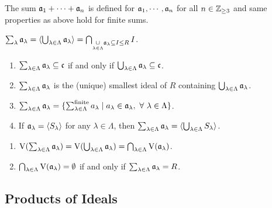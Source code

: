 \begin{remark}
    The sum $\mathfrak{a}_1 + \cdots + \mathfrak{a}_n$ is defined for $\mathfrak{a}_1,\cdots,\mathfrak{a}_n$ for all $n \in \mathbb{Z}_{\geq 3}$ and same properties as above hold for finite sums.
\end{remark}

\begin{definition}
    $\sum_{\lambda} \mathfrak{a}_\lambda = \langle \bigcup_{\lambda \in \Lambda} \mathfrak{a}_\lambda \rangle = \bigcap_{\underset {\lambda \in \Lambda} \cup \mathfrak{a}_\lambda \subseteq I \leq R} I$.
\end{definition}

\begin{fact}
    \begin{enumerate}
        \item $\sum_{\lambda \in \Lambda} \mathfrak{a}_\lambda \subseteq \mathfrak{c}$ if and only if $\bigcup_{\lambda \in \Lambda} \mathfrak{a}_\lambda \subseteq \mathfrak{c}$.
        \item $\sum_{\lambda \in \Lambda} \mathfrak{a}_\lambda$ is the (unique) smallest ideal of $R$ containing $\bigcup_{\lambda \in \Lambda} \mathfrak{a}_\lambda$.
        \item $\sum_{\lambda \in \Lambda} \mathfrak{a}_\lambda = \{\sum_{\lambda \in \Lambda}^{\text{finite}}a_\lambda \mid a_\lambda \in \mathfrak{a}_\lambda, \ \forall \  \lambda \in \Lambda\}$.
        \item If $\mathfrak{a}_\lambda = \langle S_\lambda \rangle$ for any $\lambda \in \Lambda$, then $\sum_{\lambda \in \Lambda} \mathfrak{a}_\lambda = \langle \bigcup_{\lambda \in \Lambda}S_\lambda \rangle$.
    \end{enumerate}
\end{fact}

\begin{fact}
    \begin{enumerate}
        \item $\operatorname{V}(\sum_{\lambda \in \Lambda} \mathfrak{a}_\lambda) = \operatorname{V}(\bigcup_{\lambda \in \Lambda} \mathfrak{a}_\lambda) = \bigcap_{\lambda \in \Lambda} \operatorname{V}(\mathfrak{a}_\lambda)$.
        \item $\bigcap_{\lambda \in \Lambda} \operatorname{V}(\mathfrak{a}_\lambda) = \emptyset$ if and only if $\sum_{\lambda \in \Lambda} \mathfrak{a}_\lambda = R$.
    \end{enumerate}
\end{fact}

\subsection*{Products of Ideals}

